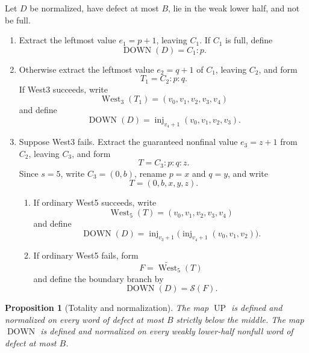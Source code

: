 \documentclass[11pt]{article}
\newtheorem{proposition}[theorem]{Proposition}
\theoremstyle{definition}
\theoremstyle{remark}
\newcommand{\UP}{\operatorname{UP}}
\newcommand{\DOWN}{\operatorname{DOWN}}
\newcommand{\West}{\operatorname{West}}
\newcommand{\inj}{\operatorname{inj}}
\newcommand{\Save}{\mathcal S}
\begin{document}
Let $D$ be normalized, have defect at most $B$, lie in the weak lower half,
and not be full.
\begin{enumerate}
\item Extract the leftmost value $e_1=p+1$, leaving $C_1$.  If $C_1$ is
full, define
\begin{equation}
 \DOWN(D)=C_1:p.
 \label{eq:down-full}
\end{equation}
\item Otherwise extract the leftmost value $e_2=q+1$ of $C_1$, leaving
$C_2$, and form
\[
 T_1=C_2:p:q.
\]
If West3 succeeds, write
\[
 \West_3(T_1)=(v_0,v_1,v_2,v_3,v_4)
\]
and define
\begin{equation}
 \DOWN(D)=\inj_{v_4+1}(v_0,v_1,v_2,v_3).
 \label{eq:down-west3}
\end{equation}
\item Suppose West3 fails.  Extract the guaranteed nonfinal value
$e_3=z+1$ from $C_2$, leaving $C_3$, and form
\[
 T=C_3:p:q:z.
\]
Since $s=5$, write $C_3=(0,b)$, rename $p=x$ and $q=y$, and write
\[
 T=(0,b,x,y,z).
\]
  \begin{enumerate}
  \item If ordinary West5 succeeds, write
  \[
    \West_5(T)=(v_0,v_1,v_2,v_3,v_4)
  \]
  and define
  \begin{equation}
    \DOWN(D)=
    \inj_{v_3+1}\bigl(
      \inj_{v_4+1}(v_0,v_1,v_2)
    \bigr).
    \label{eq:down-west5}
  \end{equation}
  \item If ordinary West5 fails, form
  \[
    F=\widetilde{\West}_5(T)
  \]
  and define the boundary branch by
  \begin{equation}
    \DOWN(D)=\Save(F).
    \label{eq:down-boundary}
  \end{equation}
  \end{enumerate}
\end{enumerate}

\begin{proposition}[Totality and normalization]
\label{prop:totality}
The map $\UP$ is defined and normalized on every word of defect at most $B$
strictly below the middle.  The map $\DOWN$ is defined and normalized on
every weakly lower-half nonfull word of defect at most $B$.
\end{proposition}
\end{document}
